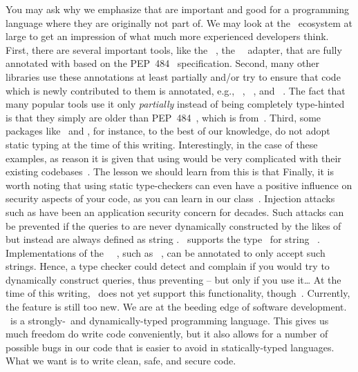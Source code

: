 You may ask why we emphasize that  are important and good for a programming language where they are originally not part of.
We may look at the \python\ ecosystem at large to get an impression of what much more experienced developers think.
First, there are several important tools, like the \psycopg~\cite{VDGE2022PPDAFP:ST}, the \postgresql\ \python\ adapter, that are fully annotated with  based on the PEP~484~\cite{PEP484} specification.
Second, many other libraries use these annotations at least partially and/or try to ensure that code which is newly contributed to them is annotated, e.g., \matplotlib~\cite{HDFDM2012MVWP:CG}, \numpy~\cite{N2025N:TNT}, and \pandas~\cite{PD2025P:CTTCB}.
The fact that many popular tools use it only \emph{partially} instead of being completely type-hinted is that they simply are older than PEP~484~\cite{PEP484}, which is from~\citeyear{PEP484}.
Third, some packages like \scikitlearn\ and \scipy, for instance, to the best of our knowledge, do not adopt static typing at the time of this writing.
Interestingly, in the case of these examples, as reason it is given that using  would be very complicated with their existing codebases~\cite{CFNYLH2020ST,DPVPCHG2018ATHFS}.
The lesson we should learn from this is that%
%
%
%
Finally, it is worth noting that using static type-checkers can even have a positive influence on security aspects of your code, as you can learn in our  class~\cite{databases}.
Injection attacks such as  have been an application security concern for decades.
Such attacks can be prevented if the queries to  are never dynamically constructed by the likes of  but instead are always defined as string .
\python\ supports the type~ for string ~\cite{PEP675}.
Implementations of the \python\ \db\ , such as \psycopg~\cite{VDGE2022PPDAFP:ST}, can be annotated to only accept such strings.
Hence, a type checker could detect and complain if you would try to dynamically construct queries, thus preventing  -- but only if you use it\dots
At the time of this writing, \mypy\ does not yet support this functionality, though~\cite{ZDWVSLS2022I1SP6L,VDGE2022PPDAFP:ST}.
Currently, the feature is still too new.
We are at the beeding edge of software development.%
%
\FloatBarrier%
\endhsection%
%
%
\python\ is a strongly-\ and dynamically-typed programming language.
This gives us much freedom do write code conveniently, but it also allows for a number of possible bugs in our code that is easier to avoid in statically-typed languages.
What we want is to write clean, safe, and secure code.

